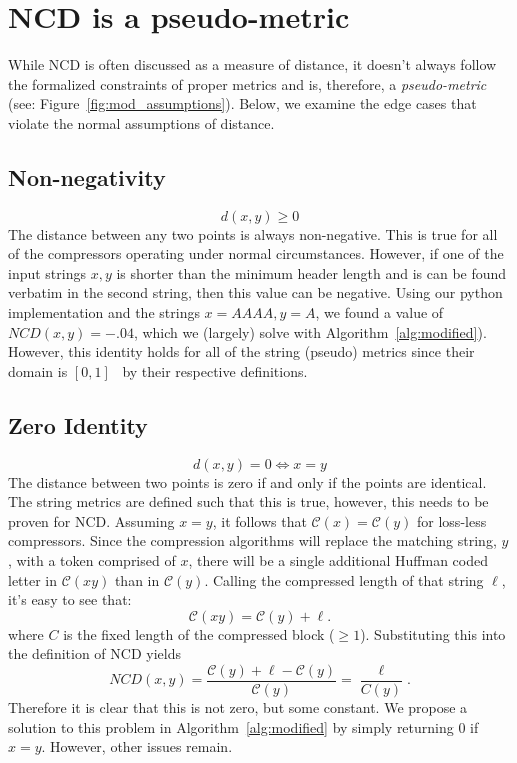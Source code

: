 \documentclass[conference]{IEEEtran}
\begin{document}
\section{NCD is a pseudo-metric}
\label{pseudometric}
While NCD is often discussed as a measure of distance, it doesn't always follow the formalized constraints of proper metrics and is, therefore, a \textit{pseudo-metric} (see: Figure~\ref{fig:mod_assumptions}). Below, we examine the edge cases that violate the normal assumptions of distance.

\subsection{Non-negativity} 
\[
d(x, y) \geq 0
\]
The distance between any two points is always non-negative. This is true for all of the compressors operating under normal circumstances. However, if one of the input strings $x,y$ is shorter than the minimum header length and is can be found verbatim in the second string, then this value can be negative. Using our python implementation and the strings $x=AAAA, y=A$, we found a value of $NCD(x,y) = -.04$, which we (largely) solve with Algorithm~\ref{alg:modified}).
However, this identity holds for all of the string (pseudo) metrics since their domain is $[0,1]$~\cite{metrics,levenshtein} by their respective definitions. 


\subsection{Zero Identity} 
\[
d(x, y) = 0 \iff x = y
\]
The distance between two points is zero if and only if the points are identical. The string metrics are defined such that this is true, however, this needs to be proven for NCD.
Assuming $x = y$, it follows that $\mathcal{C}(x) = \mathcal{C}(y)$ for loss-less compressors.
Since the compression algorithms will replace the matching string, $y$, with a token comprised of $x$, there will be a single additional Huffman coded letter in $\mathcal{C}(xy)$ than in $\mathcal{C}(y)$. Calling the compressed length of that  string $\ell$, it's easy to see that:
$$
\mathcal{C}(xy) = \mathcal{C}(y) + \ell.
$$
where $C$ is the fixed length of the compressed block ($\geq 1$).
Substituting this into the definition of NCD yields
$$
NCD(x,y) = \frac{\mathcal{C}(y) + \ell - \mathcal{C}(y)}{\mathcal{C}(y)} = \frac{\ell}{C(y)}.
$$
Therefore it is clear that this is not zero, but some constant. 
We propose a solution to this problem in Algorithm~\ref{alg:modified} by simply returning 0 if $x=y$. However, other issues remain. 
\end{document}
